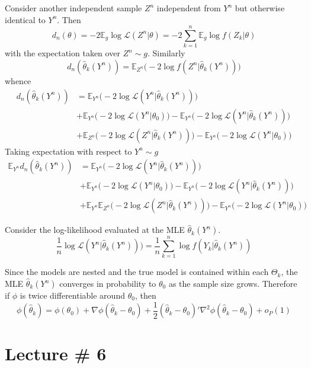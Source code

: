 \documentclass[a4paper]{article}
\newcommand{\Lcal}{\mathcal{L}}
\newcommand{\ex}{\mathbb{E}}
\begin{document}
Consider another independent sample $Z^n$ independent from $Y^n$ but otherwise
identical to $Y^n$. Then
\[
d_n(\theta)
= - 2 \ex_g \log \Lcal(Z^n\rvert \theta)
= - 2 \sum_{k=1}^n \ex_g \log f(Z_k\rvert \theta)
\]
with the expectation taken over $Z^n\sim g$. Similarly
\[ d_n(\hat{\theta}_k(Y^n)) = \ex_{Z^n} \bigl( - 2 \log f(Z^n\rvert \hat{\theta}_k(Y^n))\bigr) \]
whence
\begin{align*}
	d_n(\hat{\theta}_k(Y^n))
	&= \ex_{Y^n}\bigl(-2\log \Lcal(Y^n\rvert \hat{\theta}_k(Y^n))\bigr) \\
	&+ \ex_{Y^n}\bigl(-2\log \Lcal(Y^n\rvert \theta_0)\bigr) - \ex_{Y^n}\bigl(-2\log\Lcal(Y^n\rvert \hat{\theta}_k(Y^n))\bigr) \\
	&+ \ex_{Z^n}\bigl(-2\log \Lcal(Z^n\rvert \hat{\theta}_k(Y^n)) \bigr) - \ex_{Y^n}\bigl(-2\log \Lcal(Y^n\rvert \theta_0)\bigr)
\end{align*}
Taking expectation with respect to $Y^n\sim g$
\begin{align*}
	\ex_{Y^n} d_n(\hat{\theta}_k(Y^n))
	&= \ex_{Y^n}\bigl(-2\log \Lcal(Y^n\rvert \hat{\theta}_k(Y^n))\bigr) \\
	&+ \ex_{Y^n}\bigl(-2\log \Lcal(Y^n\rvert \theta_0)\bigr) - \ex_{Y^n}\bigl(-2\log\Lcal(Y^n\rvert \hat{\theta}_k(Y^n))\bigr) \\
	&+ \ex_{Y^n} \ex_{Z^n}\bigl(-2\log \Lcal(Z^n\rvert \hat{\theta}_k(Y^n)) \bigr) - \ex_{Y^n}\bigl(-2\log \Lcal(Y^n\rvert \theta_0)\bigr)
\end{align*}

Consider the log-likelihood evaluated at the MLE $\hat{\theta}_k(Y^n)$.
\[
\frac{1}{n} \log \Lcal(Y^n\rvert \hat{\theta}_k(Y^n))\bigr)
= \frac{1}{n} \sum_{k=1}^n \log f(Y_k\rvert \hat{\theta}_k(Y^n) )
\]

Since the models are nested and the true model is contained within each $\Theta_k$,
the MLE $\hat{\theta}_k(Y^n)$ converges in probability to $\theta_0$ as the sample
size grows. Therefore if $\phi$ is twice differentiable around $\theta_0$, then 
\[
\phi(\hat{\theta}_k)
= \phi(\theta_0)
+ \nabla \phi (\hat{\theta}_k - \theta_0)
+ \frac{1}{2} (\hat{\theta}_k - \theta_0)' \nabla^2 \phi (\hat{\theta}_k - \theta_0)
+ o_P(1)
\]



\clearpage
\section{Lecture \# 6} %
\label{sec:lecture_6}
\end{document}
